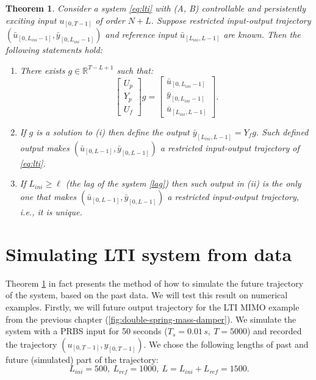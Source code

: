 \documentclass[12pt,a4paper]{report}
\newtheorem{theorem}{Theorem}
\begin{document}
\begin{theorem}
    Consider a system \eqref{eq:lti} with (A, B) controllable and persistently exciting input $u_{[0, T-1]}$ of order $N+L$. Suppose restricted input-output trajectory \((\bar{u}_{[0, L_{ini}-1]}, \bar{y}_{[0, L_{ini}-1]})\)
    and reference input \(\bar{u}_{[L_{ini}, L-1]}\) are known. Then the following statements hold:
    \begin{enumerate}
        \item[(i)] There exists $g\in\mathbb{R}^{T-L+1}$ such that: \[\begin{bmatrix}U_p \\ Y_p \\ U_f\end{bmatrix}g =
                \begin{bmatrix} \bar{u}_{[0, L_{ini} -1]} \\ \bar{y}_{[0, L_{ini} -1]} \\ \bar{u}_{[L_{ini}, L-1]}\end{bmatrix}.\]
        \item[(ii)] If $g$ is a solution to (i) then define the output \(\bar{y}_{[L_{ini}, L-1]} = Y_{f}g\). Such defined output
                    makes \((\bar{u}_{[0, L-1]}, \bar{y}_{[0, L-1]})\) a restricted input-output trajectory of \eqref{eq:lti}.
        \item[(iii)] If $L_{ini} \geq \ell$ (the lag of the system \ref{lag}) then such output in (ii) is the only one that makes \((\bar{u}_{[0, L-1]}, \bar{y}_{[0, L-1]})\)
                    a restricted input-output trajectory, i.e., it is unique.
    \end{enumerate}
    \label{thm:sim}
\end{theorem}

\clearpage

\section{Simulating LTI system from data}
\label{sec:lti-sim}

Theorem \ref{thm:sim} in fact presents the method of how to simulate the future trajectory of the system, based on the past data. We will test this result on numerical examples. Firstly, we will future output trajectory
for the LTI MIMO example from the previous chapter (\ref{fig:double-spring-mass-damper}). We simulate the system with a PRBS input for 50 seconds ($T_s = 0.01\,s,\ T = 5000$) and recorded the trajectory
\((u_{[0, T-1]}, y_{[0, T-1]})\). We chose the following lengths of past and future (simulated) part of the trajectory:
\[L_{ini} = 500, \ L_{ref} = 1000, \ L = L_{ini} + L_{ref} = 1500.\]
\end{document}
